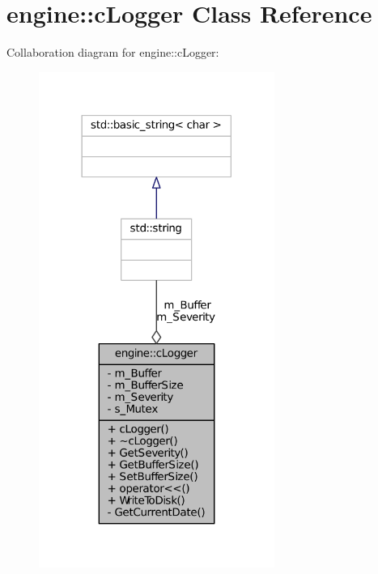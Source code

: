 \hypertarget{classengine_1_1cLogger}{
\section{engine\-:\-:c\-Logger \-Class \-Reference}
\label{classengine_1_1cLogger}
}


\-Collaboration diagram for engine\-:\-:c\-Logger\-:\nopagebreak
\begin{figure}[H]
\begin{center}
\leavevmode
\includegraphics[width=218pt]{classengine_1_1cLogger__coll__graph}
\end{center}
\end{figure}
